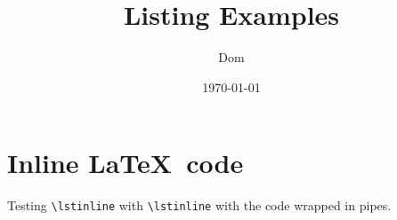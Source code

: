 \documentclass{article}
\title{Listing Examples}
\author{Dom}
\date{\today}
\begin{document}
    \section{Inline \LaTeX\ code}

    Testing \lstinline|\lstinline| with \verb|\lstinline| with the code wrapped in pipes.
\end{document}
